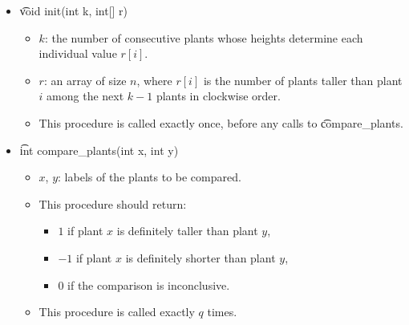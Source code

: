 \begin{itemize}
\item \t{void init(int k, int[] r)}

\begin{itemize}
\item $k$: the number of consecutive plants whose heights determine each individual value $r[i]$.
\item $r$: an array of size $n$, where $r[i]$ is the number of plants taller than plant $i$ among the next $k-1$ plants in clockwise order.
\item This procedure is called exactly once, before any calls to \t{compare\_plants}.
\end{itemize}

\item \t{int compare\_plants(int x, int y)}
\begin{itemize}
\item $x$, $y$: labels of the plants to be compared.
\item This procedure should return:
\begin{itemize}
  \item $1$ if plant $x$ is definitely taller than plant $y$,
  \item $-1$ if plant $x$ is definitely shorter than plant $y$,
  \item $0$ if the comparison is inconclusive.
\end{itemize}
\item This procedure is called exactly $q$ times.
\end{itemize}
\end{itemize}




